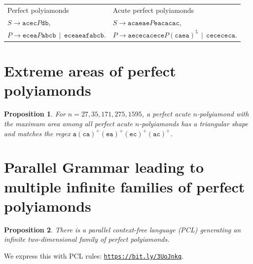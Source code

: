 \documentclass[a4paper,12pt]{article}
\newtheorem{proposition}{\bf Proposition}[section]
\begin{document}
\begin{tabular}{ |l|l| } 
\hline
Perfect polyiamonds & Acute perfect polyiamonds \\ 
$S \rightarrow \mathtt{acec}P\mathtt{db}$, & 
$S \rightarrow \mathtt{acaeae}P\mathtt{eacacac}$, \\ 
$P \rightarrow \mathtt{ecea}P\mathtt{abcb} \,\mid\, \mathtt{eceaeafabcb}.$ & 
$P \rightarrow \mathtt{aececacece}P(\mathtt{caea})^5 \,\mid\, \mathtt{cecececa}.$\\ 
\hline
\end{tabular}










\section{Extreme areas of perfect polyiamonds}

\begin{proposition}
For $n = 27, 35, 171, 275, 1595$, a perfect acute $n$-polyiamond with the 
maximum area among all perfect acute $n$-polyiamonds has a 
triangular shape and matches the regex 
$\mathtt{a}(\mathtt{ca})^{+}(\mathtt{ea})^{+}(\mathtt{ec})^{+}(\mathtt{ac})^{+}$. 
\end{proposition}





\section{Parallel Grammar leading to multiple infinite families of perfect polyiamonds}



\begin{proposition}
There is a {\em parallel context-free language (PCL)}\cite{Siromoney1974} 
generating an infinite two-dimensional family of perfect polyiamonds.
\end{proposition}

We express this with PCL rules: {\tt \url{https://bit.ly/3UoJnkq}}.
\end{document}
